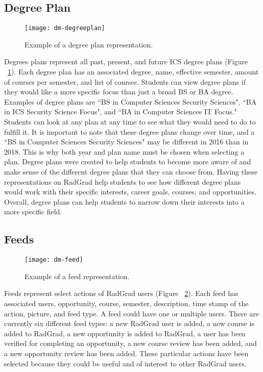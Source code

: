 \subsection{Degree Plan}
\begin{figure}[htbp!]
\centering
\texttt{[image: dm-degreeplan]}
\caption{Example of a degree plan representation.}
\label{degree-plan}
\end{figure}
Degrees plans represent all past, present, and future ICS degree plans (Figure ~\ref{degree-plan}). Each degree plan has an associated degree, name, effective semester, amount of courses per semester, and list of courses. Students can view degree plans if they would like a more specific focus than just a broad BS or BA degree. Examples of degree plans are ``BS in Computer Sciences Security Sciences", ``BA in ICS Security Science Focus", and ``BA in Computer Sciences IT Focus." Students can look at any plan at any time to see what they would need to do to fulfill it. It is important to note that these degree plans change over time, and a ``BS in Computer Sciences Security Sciences" may be different in 2016 than in 2018. This is why both year and plan name must be chosen when selecting a plan.  Degree plans were created to help students to become more aware of and make sense of the different degree plans that they can choose from. Having these representations on RadGrad help students to see how different degree plans would work with their specific interests, career goals, courses, and opportunities. Overall, degree plans can help students to narrow down their interests into a more specific field. 

\subsection{Feeds}
\begin{figure}[htbp!]
\centering
\texttt{[image: dm-feed]}
\caption{Example of a feed representation.}
\label{feed}
\end{figure}
Feeds represent select actions of RadGrad users (Figure ~\ref{feed}). Each feed has associated users, opportunity, course, semester, description, time stamp of the action, picture, and feed type. A feed could have one or multiple users. There are currently six different feed types: a new RadGrad user is added, a new course is added to RadGrad, a new opportunity is added to RadGrad, a user has been verified for completing an opportunity, a new course review has been added, and a new opportunity review has been added. These particular actions have been selected because they could be useful and of interest to other RadGrad users.

